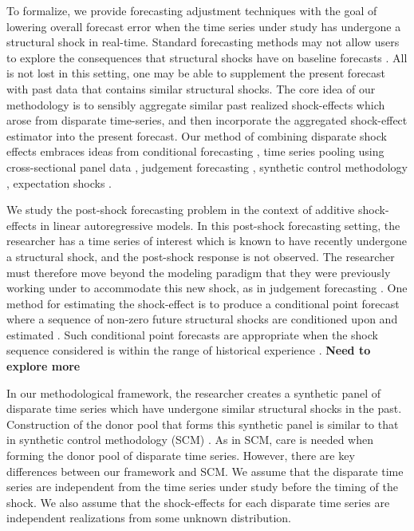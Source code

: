\documentclass[11pt]{article}
\theoremstyle{definition}
\begin{document}
To formalize, we provide forecasting adjustment techniques with the goal of lowering overall forecast error when the time series under study has undergone a structural shock in real-time. Standard forecasting methods may not allow users to explore the consequences that structural shocks have on baseline forecasts \citep{baumeister2014real}. All is not lost in this setting, one may be able to supplement the present forecast with past data that contains similar structural shocks. The core idea of our methodology is to sensibly aggregate similar past realized shock-effects which arose from disparate time-series, and then incorporate the aggregated shock-effect estimator into the present forecast. Our method of combining disparate shock effects embraces ideas from conditional forecasting \citep{baumeister2014real, kilian2017structural}, time series pooling using cross-sectional panel data \citep{ramaswamy1993empirical, pesaran1999pooled, hoogstrate2000pooling, baltagi2008forecasting, koop2012forecasting, liu2020forecasting}, judgement forecasting \citep{svensson2005monetary, monti2008forecast}, synthetic control methodology \citep{abadie2010synthetic, agarwal2020two}, expectation shocks \citep{croushore2006data, clements2019measuring}. 

We study the post-shock forecasting problem in the context of additive shock-effects in linear autoregressive models. In this post-shock forecasting setting, the researcher has a time series of interest which is known to have recently undergone a structural shock, and the post-shock response is not observed. The researcher must therefore move beyond the modeling paradigm that they were previously working under to accommodate this new shock, as in judgement forecasting \citep{monti2008forecast, svensson2005monetary}. One method for estimating the shock-effect is to produce a conditional point forecast where a sequence of non-zero future structural shocks are conditioned upon and estimated \citep{baumeister2014real}. Such conditional point forecasts are appropriate when the shock sequence considered is within the range of historical experience \citep{kilian2017structural}. {\bf Need to explore more}

In our methodological framework, the researcher creates a synthetic panel of disparate time series which have undergone similar structural shocks in the past. Construction of the donor pool that forms this synthetic panel is similar to that in synthetic control methodology (SCM) \citep{abadie2010synthetic}. As in SCM, care is needed when forming the donor pool of disparate time series. However, there are key differences between our framework and SCM. We assume that the disparate time series are independent from the time series under study before the timing of the shock. We also assume that the shock-effects for each disparate time series are independent realizations from some unknown distribution. 
\end{document}
